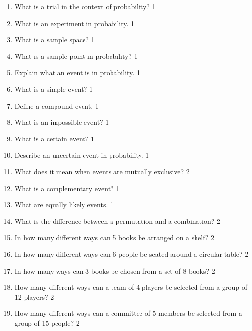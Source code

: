 \documentclass[a4paper,oneside, margin=1.4in]{book}
\begin{document}
  \begin{enumerate}
    \item What is a trial in the context of probability? \hfill 1

\item What is an experiment in probability. \hfill 1

\item What is a sample space? \hfill 1

\item What is a sample point in probability? \hfill 1

\item Explain what an event is in probability. \hfill 1

\item What is a simple event? \hfill 1

\item Define a compound event. \hfill 1

\item What is an impossible event? \hfill 1

\item What is a certain event? \hfill 1

\item Describe an uncertain event in probability. \hfill 1

\item What does it mean when events are mutually exclusive? \hfill 2

\item What is a complementary event? \hfill 1

\item What are equally likely events. \hfill 1

\item What is the difference between a permutation and a combination? \hfill 2

\item In how many different ways can 5 books be arranged on a shelf? \hfill 2

\item
In how many different ways can 6 people be seated around a circular table? \hfill 2

\item
In how many ways can 3 books be chosen from a set of 8 books? \hfill 2

\item
How many different ways can a team of 4 players be selected from a group of 12 players? \hfill 2

\item
How many different ways can a committee of 5 members be selected from a group of 15 people? \hfill 2


\end{enumerate}
\end{document}
